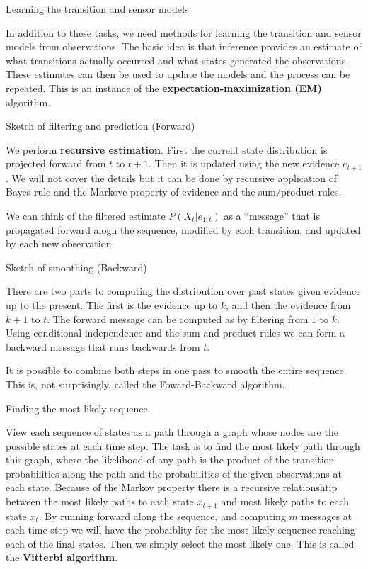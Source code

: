 \documentclass[12pt]{beamer}
\begin{document}
\begin{frame}{Learning the transition and sensor models}

In addition to these tasks, we need methods for learning the
transition and sensor models from observations. The basic idea is that
inference provides an estimate of what transitions actually occurred
and what states generated the observations. These estimates can then be used
to update the models and the process can be repeated. This is an instance of the
{\bf expectation-maximization (EM)} algorithm. 

\end{frame} 

\begin{frame}{Sketch of filtering and prediction (Forward)}

  We perform {\bf recursive estimation}. First the current state
  distribution is projected forward from $t$ to $t+1$. Then it is
  updated using the new evidence $e_{t+1}$. We will not cover the
  details but it can be done by recursive application of Bayes rule
  and the Markove property of evidence and the sum/product rules.
  
  We can think of the filtered estimate $P(X_t | e_{1:t})$ as a
  ``message'' that is propagated forward alogn the sequence, modified
  by each transition, and updated by each new observation.
  
\end{frame}


\begin{frame}{Sketch of smoothing (Backward)}

  There are two parts to computing the distribution over past states
  given evidence up to the present. The first is the evidence up to
  $k$, and then the evidence from $k+1$ to $t$. The forward message
  can be computed as by filtering from $1$ to $k$. Using conditional
  independence and the sum and product rules we can form a backward
  message that runs backwards from $t$.

  It is possible to combine both steps in one pass to smooth the
  entire sequence. This is, not surprisingly, called the Foward-Backward
  algorithm. 
\end{frame}


\begin{frame}{Finding the most likely sequence}

View each sequence of states as a path through a graph whose nodes are
the possible states at each time step. The task is to find the most
likely path through this graph, where the likelihood of any path is
the product of the transition probabilities along the path and the
probabilities of the given observations at each state. Because of the
Markov property there is a recursive relationshtip between the most
likely paths to each state $x_{t+1}$ and most likely paths to each
state $x_t$. By running forward along the sequence, and computing $m$
messages at each time step we will have the probaiblity for the most
likely sequence reaching each of the final states. Then we simply
select the most likely one. This is called the {\bf Vitterbi
  algorithm}. 
  
  \end{frame} 
\end{document}
